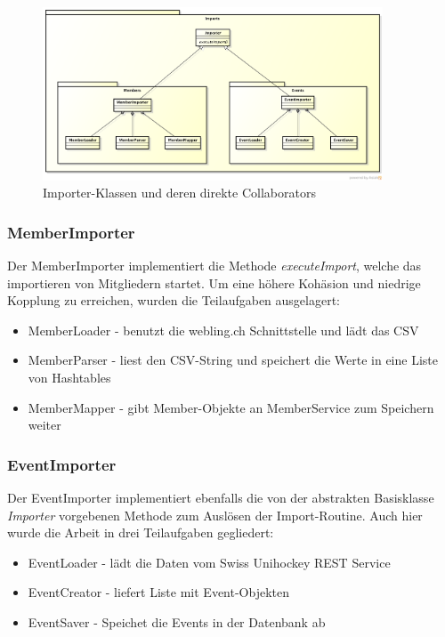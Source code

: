 	    \begin{figure}[h]
	  		\vspace{-5pt}
	    	\centering
	    	 \includegraphics[width=0.9\textwidth]{content/architekturdokumentation/images/ImportPackageDesign.png}
	  		\vspace{-25pt}
			\caption{Importer-Klassen und deren direkte Collaborators}
		\end{figure}
		
		\subsubsection{MemberImporter}
			Der MemberImporter implementiert die Methode \textit{executeImport}, welche das importieren von Mitgliedern startet. Um eine höhere Kohäsion und niedrige Kopplung zu erreichen, wurden die Teilaufgaben ausgelagert:
			\\\begin{itemize}	
				\item MemberLoader - benutzt die webling.ch Schnittstelle und lädt das CSV
				\item MemberParser - liest den CSV-String und speichert die Werte in eine Liste von Hashtables
				\item MemberMapper - gibt Member-Objekte an MemberService zum Speichern weiter\\
			\end{itemize}



		\subsubsection{EventImporter}
			Der EventImporter implementiert ebenfalls die von der abstrakten Basisklasse \textit{Importer} vorgebenen Methode zum Auslösen der Import-Routine. Auch hier wurde die Arbeit in drei Teilaufgaben gegliedert:
			\\\begin{itemize}	
				\item EventLoader - lädt die Daten vom Swiss Unihockey REST Service
				\item EventCreator - liefert Liste mit Event-Objekten
				\item EventSaver - Speichet die Events in der Datenbank ab\\
			\end{itemize}
	
